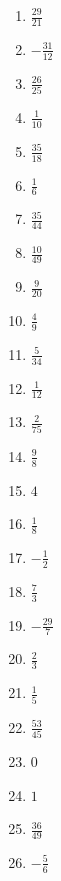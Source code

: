 \begin{Answer}[ref=bruecheA1]
	\begin{minipage}{\textwidth}
		\begin{minipage}{0.46\textwidth}
			\begin{enumerate}[label=\alph*)]
				\item \(\frac{29}{21}\)
				\item \(-\frac{31}{12}\)
				\item \(\frac{26}{25}\)
				\item \(\frac{1}{10}\)
				\item \(\frac{35}{18}\)
				\item \(\frac{1}{6}\)
				\item \(\frac{35}{44}\)
				\item \(\frac{10}{49}\)
				\item \(\frac{9}{20}\)
				\item \(\frac{4}{9}\)
				\item \(\frac{5}{34}\)
				\item \(\frac{1}{12}\)
				\item \(\frac{2}{75}\)
			\end{enumerate}
		\end{minipage}%
		\begin{minipage}{0.54\textwidth}
			\begin{enumerate}[label=\alph*)]
				\setcounter{enumi}{13}
				\item \(\frac{9}{8}\)
				\item \(4\)
				\item \(\frac{1}{8}\)
				\item \(-\frac{1}{2}\)
				\item \(\frac{7}{3}\)
				\item \(-\frac{29}{7}\)
				\item \(\frac{2}{3}\)
				\item \(\frac{1}{5}\)
				\item \(\frac{53}{45}\)
				\item \(0\)
				\item \(1\)
				\item \(\frac{36}{49}\)
				\item \(-\frac{5}{6}\)
			\end{enumerate}
		\end{minipage}%
	\end{minipage}%
\end{Answer}
\newpage

